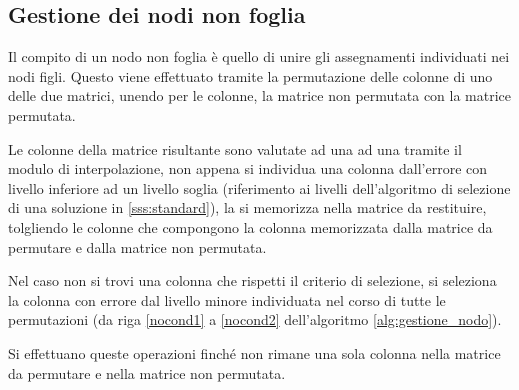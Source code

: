 \documentclass[a4paper,12pt]{report}
\begin{document}
  \subsection{Gestione dei nodi non foglia}
  Il compito di un nodo non foglia è quello di unire gli assegnamenti individuati nei nodi figli. Questo viene effettuato tramite la permutazione delle colonne di uno delle due matrici, unendo per le colonne, la matrice non permutata con la matrice permutata.

  Le colonne della matrice risultante sono valutate ad una ad una tramite il modulo di interpolazione, non appena si individua una colonna dall'errore con livello inferiore ad un livello soglia (riferimento ai livelli dell'algoritmo di selezione di una soluzione in \ref{sss:standard}), la si memorizza nella matrice da restituire, tolgliendo le colonne che compongono la colonna memorizzata dalla matrice da permutare e dalla matrice non permutata.

  Nel caso non si trovi una colonna che rispetti il criterio di selezione, si seleziona la colonna con errore dal livello minore individuata nel corso di tutte le permutazioni (da riga \ref{nocond1} a \ref{nocond2} dell'algoritmo \ref{alg:gestione_nodo}).

  Si effettuano queste operazioni finché non rimane una sola colonna nella matrice da permutare e nella matrice non permutata.
\end{document}
